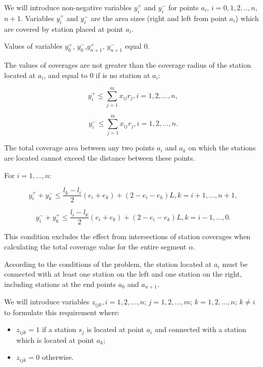 We will introduce non-negative variables $y_i^+$  and  $y_i^-$ for points $a_i$, $i=0,1,2,..,n$, $n+1$.
Variables $y_i^+$ and  $y_i^-$  are the area sizes (right and left from point $a_i$) which are covered by station placed at point $a_i$.

Values of  variables $y_0^+$, $y_0^-$,$y_{n+1}^+$, $y_{n+1}^-$ equal 0.

The values of coverages are not greater than the coverage radius of the station located at $a_i$, and equal to 0 if is no station at $a_i$:

\begin{displaymath}
y_i^+\le\sum_{j=1}^{m}{x_{ij}r_j} ,i=1,2,\ldots,n,
\end{displaymath}

\begin{displaymath}
y_i^-\le\sum_{j=1}^{m}{x_{ij}r_j} ,i=1,2,\ldots,n.
\end{displaymath}

The total coverage area between any two points $a_i$ and $a_k$ on which the stations are located cannot exceed the distance between these points.

For  $i=1,\ldots,n$:

\begin{displaymath}
y_i^+ + y_k^- \le\frac{l_k - l_i}{2}\left(e_i + e_k\right)+\left(2 - e_i - e_k\right)L, k=i+1,\ldots,n+1,
\end{displaymath}

\begin{displaymath}
y_i^- + y_k^+  \le\frac{l_i - l_k}{2}\left(e_i + e_k\right)+\left(2 - e_i - e_k\right)L ,k=i-1,\ldots,0.
\end{displaymath}

	This condition excludes the effect from intersections of station coverages when calculating the total coverage value for the entire segment $\alpha$.
	
	According to the conditions of the problem, the station located at $a_i$ must be connected with at least one station on the left and one station on the right, including stations  at the end points $a_0$ and $a_{n+1}$.

	We will introduce variables $z_{ijk}, i=1,2,\ldots,n$; $j=1,2,\ldots,m$; $k=1,2,\ldots,n$; $k\neq i$ to formulate this requirement where:

\begin{itemize}
	\item $z_{ijk}=1$ if a station $s_j$ is located at point $a_i$ and connected with a station which is located at point  $a_k$;
	\item $z_{ijk}=0$ otherwise.
\end{itemize}	
	
